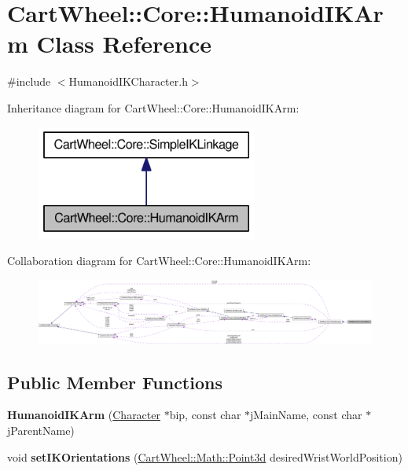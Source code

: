 \hypertarget{classCartWheel_1_1Core_1_1HumanoidIKArm}{
\section{CartWheel::Core::HumanoidIKArm Class Reference}
\label{classCartWheel_1_1Core_1_1HumanoidIKArm}
}


{\ttfamily \#include $<$HumanoidIKCharacter.h$>$}



Inheritance diagram for CartWheel::Core::HumanoidIKArm:\nopagebreak
\begin{figure}[H]
\begin{center}
\leavevmode
\includegraphics[width=206pt]{classCartWheel_1_1Core_1_1HumanoidIKArm__inherit__graph}
\end{center}
\end{figure}


Collaboration diagram for CartWheel::Core::HumanoidIKArm:\nopagebreak
\begin{figure}[H]
\begin{center}
\leavevmode
\includegraphics[width=400pt]{classCartWheel_1_1Core_1_1HumanoidIKArm__coll__graph}
\end{center}
\end{figure}
\subsection*{Public Member Functions}
\begin{DoxyCompactItemize}
\item 
\hypertarget{classCartWheel_1_1Core_1_1HumanoidIKArm_ab5986649cc2c5790296be562fbeda91b}{
{\bfseries HumanoidIKArm} (\hyperlink{classCartWheel_1_1Core_1_1Character}{Character} $\ast$bip, const char $\ast$jMainName, const char $\ast$jParentName)}
\label{classCartWheel_1_1Core_1_1HumanoidIKArm_ab5986649cc2c5790296be562fbeda91b}

\item 
\hypertarget{classCartWheel_1_1Core_1_1HumanoidIKArm_a2b138ff52f5323baa449c8a76fe9ebc4}{
void {\bfseries setIKOrientations} (\hyperlink{classCartWheel_1_1Math_1_1Point3d}{CartWheel::Math::Point3d} desiredWristWorldPosition)}
\label{classCartWheel_1_1Core_1_1HumanoidIKArm_a2b138ff52f5323baa449c8a76fe9ebc4}

\end{DoxyCompactItemize}


